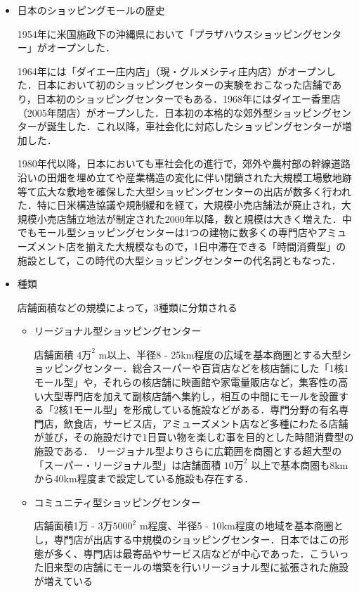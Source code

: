 \begin{itemize}
 \item	日本のショッピングモールの歴史

1954年に米国施政下の沖縄県において「プラザハウスショッピングセンター」がオープンした．

1964年には「ダイエー庄内店」（現・グルメシティ庄内店）がオープンした．日本において初のショッピングセンターの実験をおこなった店舗であり，日本初のショッピングセンターでもある．1968年にはダイエー香里店（2005年閉店）がオープンした．日本初の本格的な郊外型ショッピングセンターが誕生した．これ以降，車社会化に対応したショッピングセンターが増加した．

1980年代以降，日本においても車社会化の進行で，郊外や農村部の幹線道路沿いの田畑を埋め立てや産業構造の変化に伴い閉鎖された大規模工場敷地跡等て広大な敷地を確保した大型ショッピングセンターの出店が数多く行われた．特に日米構造協議や規制緩和を経て，大規模小売店舗法が廃止され，大規模小売店舗立地法が制定された2000年以降，数と規模は大きく増えた．中でもモール型ショッピングセンターは1つの建物に数多くの専門店やアミューズメント店を揃えた大規模なもので，1日中滞在できる「時間消費型」の施設として，この時代の大型ショッピングセンターの代名詞ともなった．

 \item	種類

店舗面積などの規模によって，3種類に分類される

\begin{itemize}
\setlength{\parskip}{3mm}

 \item	リージョナル型ショッピングセンター

店舗面積 $4万^{2}$ m以上、半径8 - 25km程度の広域を基本商圏とする大型ショッピングセンター．総合スーパーや百貨店などを核店舗にした「1核1モール型」や，それらの核店舗に映画館や家電量販店など，集客性の高い大型専門店を加えて副核店舗へ集約し，相互の中間にモールを設置する「2核1モール型」を形成している施設などがある．専門分野の有名専門店，飲食店，サービス店，アミューズメント店など多種にわたる店舗が並び，その施設だけで1日買い物を楽しむ事を目的とした時間消費型の施設である．
リージョナル型よりさらに広範囲を商圏とする超大型の「スーパー・リージョナル型」は店舗面積 $10万^{2}$ 以上で基本商圏も8kmから40km程度まで設定している施設も存在する．

 \item	コミュニティ型ショッピングセンター

店舗面積1万 - $3万5000^{2}$ m程度、半径5 - 10km程度の地域を基本商圏とし，専門店が出店する中規模のショッピングセンター．日本ではこの形態が多く、専門店は最寄品やサービス店などが中心であった．こういった旧来型の店舗にモールの増築を行いリージョナル型に拡張された施設が増えている


\end{itemize}
\end{itemize}
